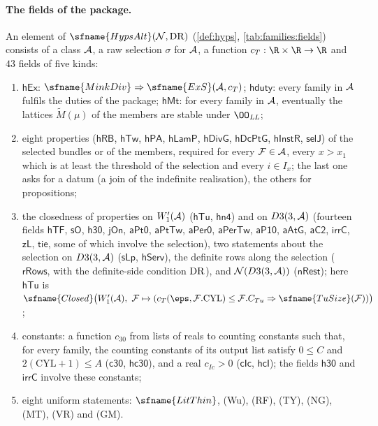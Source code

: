 \paragraph{The fields of the package.}
An element of $\sfname{HypsAlt}(\stageUNN,\stageUDR)$ (\cref{def:hyps}, \cref{tab:families:fields}) consists of a class
$\mathcal{A}$, a raw selection $\sigma$ for $\mathcal{A}$, a function $c_T:\R\times\R\to\R$ and $43$ fields of five kinds:
\begin{enumerate}[label=(F\arabic*)]
\item $\mathsf{hEx}$: $\sfname{MinkDiv}\Rightarrow\sfname{ExS}(\stageUA,c_T)$; $\mathsf{hduty}$: every family in $\mathcal{A}$
fulfils the duties of the package; $\mathsf{hMt}$: for every family in $\mathcal{A}$, eventually the lattices
$\widetilde M(\mu)$ of the members are stable under $\OO_{\mathit{LL}}$;
\item eight properties ($\mathsf{hRB}$, $\mathsf{hTw}$, $\mathsf{hPA}$, $\mathsf{hLamP}$, $\mathsf{hDivG}$, $\mathsf{hDcPtG}$,
$\mathsf{hInstR}$, $\mathsf{selJ}$) of the selected bundles or of the members, required for every $\mathcal{F}\in\mathcal{A}$,
every $x>x_1$ which is at least the threshold of the selection and every $i\in I_x$; the last one asks for a datum (a join
of the indefinite realisation), the others for propositions;
\item the closedness of properties on $W'_1(\mathcal{A})$ ($\mathsf{hTu}$, $\mathsf{hn4}$) and on $D3(3,\mathcal{A})$ (fourteen
fields $\mathsf{hTF}$, $\mathsf{sO}$, $\mathsf{h30}$, $\mathsf{jOn}$, $\mathsf{aPt0}$, $\mathsf{aPtTw}$, $\mathsf{aPer0}$,
$\mathsf{aPerTw}$, $\mathsf{aP10}$, $\mathsf{aAtG}$, $\mathsf{aC2}$, $\mathsf{irrC}$, $\mathsf{zL}$, $\mathsf{tie}$, some of
which involve the selection), two statements about the selection on $D3(3,\mathcal{A})$ ($\mathsf{sLp}$, $\mathsf{hServ}$), the
definite rows along the selection ($\mathsf{rRows}$, with the definite-side condition $\mathrm{DR}$), and
$\mathcal{N}(D3(3,\mathcal{A}))$ ($\mathsf{nRest}$); here $\mathsf{hTu}$ is
$\sfname{Closed}\bigl(W'_1(\stageUA),\ \stageUFm\mapsto(c_T(\eps,\stageUFm.\mathrm{CYL})\le\stageUFm.C_{Tu}\Rightarrow
\sfname{TuSize}(\stageUFm))\bigr)$;
\item constants: a function $c_{30}$ from lists of reals to counting constants such that, for every family, the
counting constants of its output list satisfy $0\le C$ and $2(\mathrm{CYL}+1)\le A$ ($\mathsf{c30}$, $\mathsf{hc30}$), and a
real $c_{Ic}>0$ ($\mathsf{cIc}$, $\mathsf{hcI}$); the fields $\mathsf{h30}$ and $\mathsf{irrC}$ involve these constants;
\item eight uniform statements: $\sfname{LitThin}$, (Wu), (RF), (TY), (NG), (MT), (VR) and (GM).
\end{enumerate}
